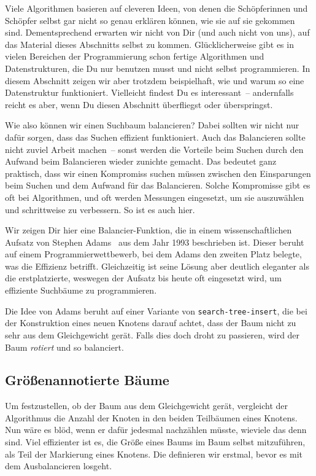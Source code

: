 Viele Algorithmen basieren auf cleveren Ideen, von denen die
Schöpferinnen und Schöpfer selbst gar nicht so genau erklären können,
wie sie auf sie gekommen sind.  Dementsprechend erwarten wir nicht von
Dir (und auch nicht von uns), auf das Material dieses Abschnitts
selbst zu kommen.  Glücklicherweise gibt es in vielen Bereichen der
Programmierung schon fertige Algorithmen und Datenstrukturen, die Du
nur benutzen musst und nicht selbst programmieren.  In diesem
Abschnitt zeigen wir aber trotzdem beispielhaft, wie und warum so eine
Datenstruktur funktioniert.  Vielleicht findest Du es interessant~--
andernfalls reicht es aber, wenn Du diesen Abschnitt überfliegst oder
überspringst.

Wie also können wir einen Suchbaum balancieren? Dabei sollten wir
nicht nur dafür sorgen, dass das Suchen effizient funktioniert.  Auch
das Balancieren sollte nicht zuviel Arbeit machen~-- sonst werden die
Vorteile beim Suchen durch den Aufwand beim Balancieren wieder
zunichte gemacht.  Das bedeutet ganz praktisch, dass wir einen
Kompromiss suchen müssen zwischen den Einsparungen beim Suchen und dem
Aufwand für das Balancieren.  Solche Kompromisse gibt es oft bei
Algorithmen, und oft werden Messungen eingesetzt, um sie auszuwählen
und schrittweise zu verbessern.  So ist es auch hier.

Wir zeigen Dir hier eine Balancier-Funktion, die in einem
wissenschaftlichen Aufsatz von Stephen Adams~\cite{Adams1993} aus dem
Jahr 1993 beschrieben ist.  Dieser beruht auf einem
Programmierwettbewerb, bei dem Adams den zweiten Platz belegte, was
die Effizienz betrifft.  Gleichzeitig ist seine Lösung aber deutlich
eleganter als die erstplatzierte, weswegen der Aufsatz bis heute oft
eingesetzt wird, um effiziente Suchbäume zu programmieren.

Die Idee von Adams beruht auf einer Variante von
\lstinline{search-tree-insert}, die bei der Konstruktion eines neuen
Knotens darauf achtet, dass der Baum nicht zu sehr aus dem
Gleichgewicht gerät.  Falls dies doch droht zu passieren, wird der
Baum \textit{rotiert} und so balanciert.

\subsection{Größenannotierte Bäume}

Um festzustellen, ob der Baum aus dem Gleichgewicht gerät, vergleicht
der Algorithmus die Anzahl der Knoten in den beiden Teilbäumen eines
Knotens.  Nun wäre es blöd, wenn er dafür jedesmal nachzählen müsste,
wieviele das denn sind.  Viel effizienter ist es, die Größe eines
Baums im Baum selbst mitzuführen, als Teil der Markierung eines
Knotens.  Die definieren wir erstmal, bevor es mit dem Ausbalancieren
losgeht.


